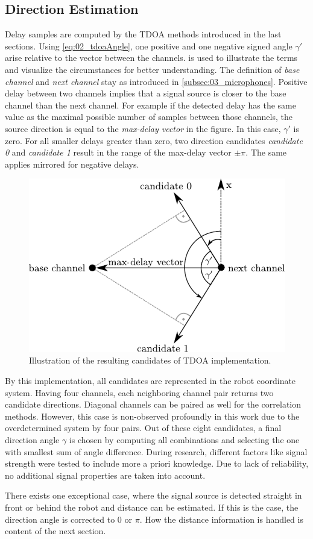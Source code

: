 \subsection{Direction Estimation}
\label{subsec:03_directionCandidates}

Delay samples are computed by the \ac{TDOA} methods introduced in the last
sections.
Using \cref{eq:02_tdoaAngle}, one positive and one negative signed angle $\gamma'$
arise relative to the vector between the channels.
 is used to illustrate the terms and visualize the
circumstances for better understanding.
The definition of \textit{base channel} and \textit{next channel} stay as introduced
in \cref{subsec:03_microphones}.
Positive delay between two channels implies that a signal source
is closer to the base channel than the next channel.
For example if the detected delay has the same value as the maximal possible number
of samples between those channels, the source direction is equal to the
\textit{max-delay vector} in the figure.
In this case, $\gamma'$ is zero.
For all smaller delays greater than zero, two direction candidates \textit{candidate 0}
and \textit{candidate 1} result in the range of the max-delay vector $\pm \pi$.
The same applies mirrored for negative delays.

\begin{figure}[ht]
	\centering
		\includegraphics[width=0.6\columnwidth]{figures/tdoa_code}
	\caption{Illustration of the resulting candidates of \ac{TDOA} implementation.}
	\label{fig:03_tdoaCode}
\end{figure}


By this implementation, all candidates are represented in the robot coordinate system.
Having four channels, each neighboring channel pair returns two candidate directions.
Diagonal channels can be paired as well for the correlation methods.
However, this case is non-observed profoundly in this work due to the overdetermined
system by four pairs.
Out of these eight candidates, a final direction angle $\gamma$ is chosen
by computing all combinations and selecting the one with smallest sum of angle difference.
During research, different factors like signal strength were tested to include
more a priori knowledge.
Due to lack of reliability, no additional signal properties are taken into account.

There exists one exceptional case, where the signal source is detected straight in front
or behind the robot and distance can be estimated.
If this is the case, the direction angle is corrected to 0 or $\pi$.
How the distance information is handled is content of the next section.
